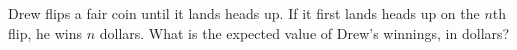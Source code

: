 Drew flips a fair coin until it lands heads up. If it first lands heads up on the $n$th flip, he wins $n$ dollars. What is the expected value of Drew's winnings, in dollars?
